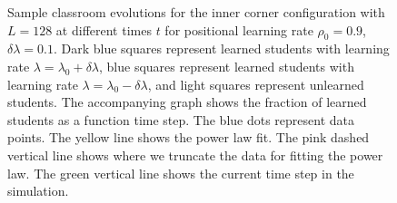 \begin{figure}[htbp!]
   \caption{Sample classroom evolutions for the inner corner configuration with $L=128$ at different times $t$ for positional learning rate $\rho_0=0.9$, $\delta\lambda = 0.1$.
   Dark blue squares represent learned students with learning rate $\lambda = \lambda_0 + \delta\lambda$, blue squares represent learned students with learning rate $\lambda = \lambda_0 - \delta\lambda$, and light squares represent unlearned students.
   The accompanying graph shows the fraction of learned students as a function time step.
   The blue dots represent data points. 
   The yellow line shows the power law fit.
   The pink dashed vertical line shows where we truncate the data for fitting the power law.
   The green vertical line shows the current time step in the simulation.
   }
    \label{fig:2DBPCAIH sample class evolution high rho}
 \end{figure}

